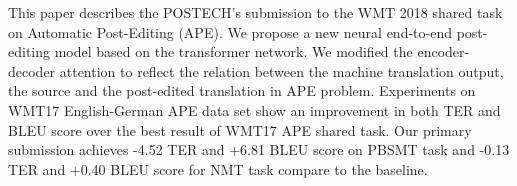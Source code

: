 This paper describes the POSTECH's submission to the WMT 2018 shared task on Automatic Post-Editing (APE). We propose a new neural end-to-end post-editing model based on the transformer network. We modified the encoder-decoder attention to reflect the relation between the machine translation output, the source and the post-edited translation in APE problem. Experiments on WMT17 English-German APE data set show an improvement in both TER and BLEU score over the best result of WMT17 APE shared task. Our primary submission achieves -4.52 TER and +6.81 BLEU score on PBSMT task and -0.13 TER and +0.40 BLEU score for NMT task compare to the baseline.
